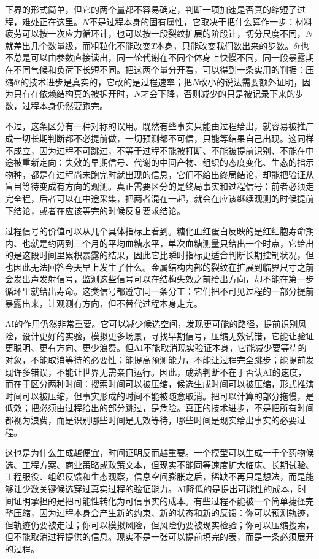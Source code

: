 下界的形式简单，但它的两个量都不容易确定，判断一项加速是否真的缩短了过程，难处正在这里。$N$不是过程本身的固有属性，它取决于把什么算作一步：材料疲劳可以按一次应力循环计，也可以按一段裂纹扩展的阶段计，切分尺度不同，$N$就差出几个数量级，而粗粒化不能改变$T$本身，只能改变我们数出来的步数。$\delta t$也不总是可以由参数直接读出，同一轮代谢在不同个体身上快慢不同，同一段暴露期在不同气候和负荷下长短不同。把这两个量分开看，可以得到一条实用的判据：压缩$\delta t$的技术进步是真实的，它改的是过程速率；把$N$改小的说法需要额外证明，因为只有在依赖结构真的被拆开时，$N$才会下降，否则减少的只是被记录下来的步数，过程本身仍然要跑完。

不过，这条区分有一种对称的误用。既然有些事实只能由过程给出，就容易被推广成一切长期判断都不必提前做，一切预测都不可信，只能等结果自己出现。这同样不成立，因为过程不可跳过，不等于过程不能被打断、不能被提前识别、不能在中途被重新定向：失效的早期信号、代谢的中间产物、组织的态度变化、生态的指示物种，都是在过程尚未跑完时就出现的信息，它们不给出终局结论，却能把验证从盲目等待变成有方向的观测。真正需要区分的是终局事实和过程信号：前者必须走完全程，后者可以在中途采集，把两者混在一起，就会在应该继续观测的时候提前下结论，或者在应该等完的时候反复要求结论。

过程信号的价值可以从几个具体指标上看到。糖化血红蛋白反映的是红细胞寿命期内、也就是约两到三个月的平均血糖水平，单次血糖测量只给出一个时点，它给出的是这段时间里累积暴露的结果，因此它比瞬时指标更适合判断长期控制状况，但也因此无法回答今天早上发生了什么。金属结构内部的裂纹在扩展到临界尺寸之前会发出声发射信号，监测这些信号可以在结构失效之前给出方向，却不能在第一步循环里就给出寿命。这类信号都遵守同一条分工：它们把不可见过程的一部分提前暴露出来，让观测有方向，但不替代过程本身走完。


AI的作用仍然非常重要。它可以减少候选空间，发现更可能的路径，提前识别风险，设计更好的实验，模拟更多场景，寻找早期信号，压缩无效试错，它能让验证更聪明、更有方向、更少浪费。但AI不能取消现实验证本身，它能减少要等待的对象，不能取消等待的必要性；能提高预测能力，不能让过程完全跳步；能提前发现许多错误，不能让世界无需亲自运行。因此，成熟判断不在于否认AI的速度，而在于区分两种时间：搜索时间可以被压缩，候选生成时间可以被压缩，形式推演时间可以被压缩，但事实形成的时间不能被随意取消。把可以计算的部分拖慢，是低效；把必须由过程给出的部分跳过，是危险。真正的技术进步，不是把所有时间都视为浪费，而是识别哪些时间是无效等待，哪些时间是现实给出事实的必要过程。

这也是为什么生成越便宜，时间证明反而越重要。一个模型可以生成一千个药物候选、工程方案、商业策略或政策文本，但现实不能同等速度扩大临床、长期试验、工程服役、组织反馈和生态观察，信息空间膨胀之后，稀缺不再只是想法，而是能够让少数关键候选穿过真实过程的验证能力。AI降低的是提出可能性的成本，时间证明承担的是把可能性转化为可信事实的成本。有些过程不能被一个简单捷径完整压缩，因为过程本身会产生新的约束、新的状态和新的反馈：你可以预测轨迹，但轨迹仍要被走过；你可以模拟风险，但风险仍要被现实检验；你可以压缩搜索，但不能取消过程提供的信息。现实不是一张可以提前填完的表，而是一条必须展开的过程。

